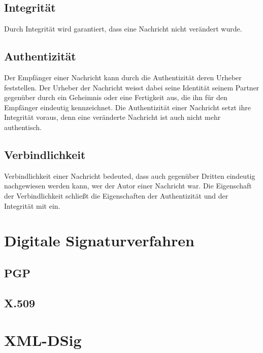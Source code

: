 \subsection{Integrität}
\label{sec:GrundlagenDefinitionen:DigitaleSignaturen:Integrität}
Durch Integrität wird garantiert, dass eine Nachricht nicht verändert wurde\cite{niag}.

\subsection{Authentizität}
\label{sec:GrundlagenDefinitionen:DigitaleSignaturen:Authentizität}
Der Empfänger einer Nachricht kann durch die Authentizität deren Urheber feststellen. Der Urheber der Nachricht weisst dabei seine Identität seinem
Partner gegenüber durch ein Geheimnis oder eine Fertigkeit aus, die ihn für den Empfänger eindeutig kennzeichnet. Die Authentizität einer Nachricht setzt ihre
Integrität voraus, denn eine veränderte Nachricht ist auch nicht mehr authentisch\cite{kits}.

\subsection{Verbindlichkeit}
\label{sec:GrundlagenDefinitionen:DigitaleSignaturen:Verbindlichkeit}
Verbindlichkeit einer Nachricht bedeuted, dass auch gegenüber Dritten eindeutig nachgewiesen werden kann, wer der Autor einer Nachricht war. Die Eigenschaft der
Verbindlichkeit schließt die Eigenschaften der Authentizität und der Integrität mit ein\cite{kits}.

\section{Digitale Signaturverfahren}
\label{sec:GrundlagenDefinitionen:DigitaleSignaturen:Verfahren}

\subsection{PGP}
\label{sec:GrundlagenDefinitionen:DigitaleSignaturen:Verfahren:pgp}

\subsection{X.509}
\label{sec:GrundlagenDefinitionen:DigitaleSignaturen:Verfahren:x509}

\section{XML-DSig}
\label{sec:GrundlagenDefinitionen:xml-dsig}
